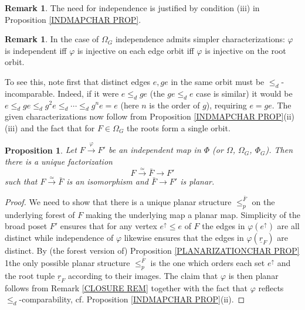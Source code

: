 \documentclass[a4paper,10pt
,draft
]{article}%
\numberwithin{equation}{section}
\numberwithin{figure}{section}
\newtheorem{proposition}[equation]{Proposition}%
\theoremstyle{definition} %
\newtheorem{remark}[equation]{Remark}%
\newcommand{\1}{\ensuremath{\mathbbm 1}}%
\begin{document}
\begin{remark}
The need for independence is justified by
condition (iii) in Proposition \ref{INDMAPCHAR PROP}.
\end{remark}


\begin{remark}\label{INDOMGALT REM}
In the case of $\Omega_G$
independence admits simpler characterizations:
$\varphi$ is independent iff $\varphi$ is injective on each edge orbit iff $\varphi$ is injective on the root orbit.

To see this, note first that distinct edges $e, g e$ in the same orbit must be $\leq_d$-incomparable.
Indeed, if it were 
$e \leq_d g e$ (the $g e \leq_d e$ case is similar)
it would be
$e \leq_d g e \leq_d g^2 e \leq_d \cdots
\leq_d g^n e = e$ (here $n$ is the order of $g$),
requiring $e=ge$.
The given characterizations now follow from
Proposition \ref{INDMAPCHAR PROP}(ii)(iii)
and the fact that for $F \in \Omega_G$ the roots form a single orbit.
\end{remark}


\begin{proposition}
\label{PLANARPULL PROP}
	Let $F \xrightarrow{\varphi} F'$ be an independent map in $\Phi$ (or $\Omega$, $\Omega_G$, $\Phi_G$). Then there is a unique factorization 
	\[F \xrightarrow{\simeq} \bar{F} \to F'\]
	such that $F \xrightarrow{\simeq} \bar{F}$ is an isomorphism and $\bar{F} \to F'$ is planar.
\end{proposition}

\begin{proof}
We need to show that there is a unique planar structure 
$\leq_p^{\bar{F}}$ on the underlying forest of $F$ making the underlying map a planar map.
Simplicity of the broad poset $F'$ ensures that for any vertex $e^{\uparrow} \leq e$ of $F$ the edges in $\varphi(e^{\uparrow})$ are all distinct while independence of $\varphi$ likewise ensures that the edges in $\varphi(\underline{r}_F)$ are distinct.
By (the forest version of) Proposition
\ref{PLANARIZATIONCHAR PROP}
1the only possible planar structure $\leq_p^{\bar{F}}$
is the one which orders each set $e^{\uparrow}$ and the root tuple $\underline{r}_F$ according to their images.
The claim that $\varphi$ is then planar follows from 
Remark \ref{CLOSURE REM}
together with the
fact that $\varphi$ reflects $\leq_d$-comparability,
cf. Proposition \ref{INDMAPCHAR PROP}(ii).
\end{proof}
\end{document}
